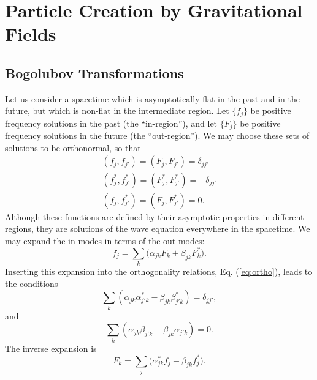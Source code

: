 \documentclass[eqsecnum,floats,aps,prd,floatfix,titlepage,tightenlines]{revtex4}
\begin{document}
\section{Particle Creation by Gravitational Fields}
\label{sec:particle-creation}


\subsection{Bogolubov Transformations}
\label{sec:Bogolubov}

    Let us consider a spacetime which is asymptotically flat in the past
and in the future, but which is non-flat in the intermediate region.
Let $\{ f_j \}$ be positive frequency solutions in the past (the 
``in-region''), and let $\{ F_j \}$ be positive frequency solutions in 
the future (the ``out-region'').  We may choose these sets of solutions
to be orthonormal, so that
\begin{eqnarray}
&(f_j,f_{j'})= (F_{j},F_{j'})=\delta _{jj'}& \nonumber \\
&(f_j^*,f_{j'}^*)= (F_{j}^*,F_{j'}^*)= -\delta _{jj'}& \nonumber \\
&(f_j,f_{j'}^*)= (F_{j},F_{j'}^*)= 0.&  \label{eq:ortho}
\end{eqnarray}
Although these functions are defined by their asymptotic properties in
different regions, they are solutions of the wave equation everywhere
in the spacetime. We may expand the in-modes in terms of the out-modes:
\begin{equation}
f_j=\sum\limits_k {(\alpha _{jk}}F_k + \beta _{jk}F_k^*).
\label{eq:in-out}
\end{equation}
Inserting this expansion into the orthogonality relations, 
Eq. (\ref{eq:ortho}), leads to the conditions
\begin{equation}
\sum\limits_k {(\alpha _{jk}\alpha _{j'k}^*-\beta _{jk}\beta_{j'k}^*)
= \delta _{jj'}}, \label{eq:alphabeta}
\end{equation}
and
\begin{equation}
 \sum\limits_k (\alpha _{jk}\beta _{j'k}-\beta _{jk}\alpha _{j'k})=0.
\end{equation}
The inverse expansion is 
\begin{equation}
F_k=\sum\limits_j {(\alpha _{jk}^*}f_j - \beta _{jk}f_j^*).
\end{equation}
\end{document}
